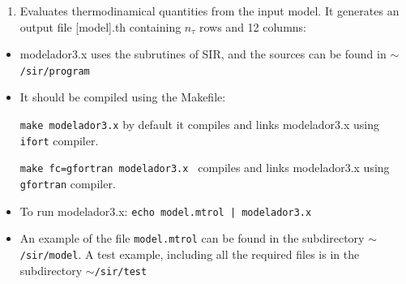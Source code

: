 \begin{enumerate}
\item Evaluates thermodinamical quantities from the input model. It generates
an output file [model].th containing $n_\tau$ rows and 12 columns:
\end{enumerate}

\begin{itemize}
\item modelador3.x uses the subrutines of SIR, and the sources can be found in {\tt $\sim$/sir/program}

\item It should be compiled using the Makefile:

{\tt make modelador3.x} by default it compiles and links modelador3.x using {\tt ifort} compiler.

{\tt make fc=gfortran modelador3.x } compiles and links modelador3.x using {\tt gfortran} compiler.

\item To run modelador3.x:   {\tt echo model.mtrol | modelador3.x}

\item An example of the file {\tt model.mtrol} can be found in the subdirectory {\tt $\sim$/sir/model}. A test example,
including all the required files is in the subdirectory {\tt $\sim$/sir/test}
\end{itemize} 

